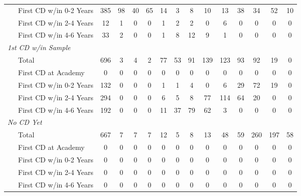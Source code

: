 {\begin{tabular}{@{\extracolsep{5pt}}lccccccccccccc}
\ \ \ First CD w/in 0-2 Years&         385&          98&          40&          65&          14&           3&           8&          10&          13&          38&          34&          52&          10\\
\ \ \ First CD w/in 2-4 Years&          12&           1&           0&           0&           1&           2&           2&           0&           6&           0&           0&           0&           0\\
\ \ \ First CD w/in 4-6 Years&          33&           2&           0&           0&           1&           8&          12&           9&           1&           0&           0&           0&           0\\
\midrule 
\textit{1st CD w/in Sample} \\
\ \ \ Total         &         696&           3&           4&           2&          77&          53&          91&         139&         123&          93&          92&          19&0\\
\ \ \ First CD at Academy&           0&           0&           0&           0&           0&           0&           0&           0&           0&           0&           0&           0&0\\
\ \ \ First CD w/in 0-2 Years&         132&           0&           0&           0&           1&           1&           4&           0&           6&          29&          72&          19&0\\
\ \ \ First CD w/in 2-4 Years&         294&           0&           0&           0&           6&           5&           8&          77&         114&          64&          20&           0&0\\
\ \ \ First CD w/in 4-6 Years&         192&           0&           0&           0&          11&          37&          79&          62&           3&           0&           0&           0&0\\
\midrule 
\textit{No CD Yet} \\
\ \ \ Total         &         667&           7&           7&           7&          12&           5&           8&          13&          48&          59&         260&         197&          58\\
\ \ \ First CD at Academy&           0&           0&           0&           0&           0&           0&           0&           0&           0&           0&           0&           0&           0\\
\ \ \ First CD w/in 0-2 Years&           0&           0&           0&           0&           0&           0&           0&           0&           0&           0&           0&           0&           0\\
\ \ \ First CD w/in 2-4 Years&           0&           0&           0&           0&           0&           0&           0&           0&           0&           0&           0&           0&           0\\
\ \ \ First CD w/in 4-6 Years&           0&           0&           0&           0&           0&           0&           0&           0&           0&           0&           0&           0&           0\\
\hline
\end{tabular}}
